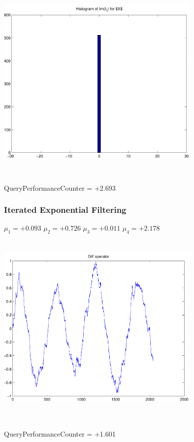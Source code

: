 \documentclass[9pt]{article}
\theoremstyle{plain}
\theoremstyle{definition}
\theoremstyle{remark}
\numberwithin{equation}{section}
\begin{document}
\includegraphics[width=10.0cm,height=10.0cm]{Im_lambda_n.pdf}

QueryPerformanceCounter  =  +2.693
\subsubsection{Iterated Exponential Filtering }
$\mu_1 =+0.093$
$\mu_2 =+0.726$
$\mu_3 =+0.011$
$\mu_4 =+2.178$
\includegraphics[width=10.0cm,height=10.0cm]{DIFF.pdf}

QueryPerformanceCounter  =  +1.601
\end{document}
